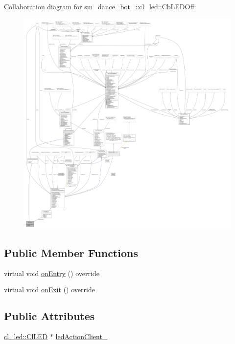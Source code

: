 Collaboration diagram for sm\+\_\+dance\+\_\+bot\+\_\+:\+:cl\+\_\+led\+:\+:Cb\+L\+E\+D\+Off\+:
\nopagebreak
\begin{figure}[H]
\begin{center}
\leavevmode
\includegraphics[width=350pt]{classsm__dance__bot__2_1_1cl__led_1_1CbLEDOff__coll__graph}
\end{center}
\end{figure}
\subsection*{Public Member Functions}
\begin{DoxyCompactItemize}
\item 
virtual void \hyperlink{classsm__dance__bot__2_1_1cl__led_1_1CbLEDOff_a101b78da1cfd4dcbec6fc607c956bd14}{on\+Entry} () override
\item 
virtual void \hyperlink{classsm__dance__bot__2_1_1cl__led_1_1CbLEDOff_a6ca7b3ba30347c4be33d3b4946009325}{on\+Exit} () override
\end{DoxyCompactItemize}
\subsection*{Public Attributes}
\begin{DoxyCompactItemize}
\item 
\hyperlink{classsm__dance__bot__2_1_1cl__led_1_1ClLED}{cl\+\_\+led\+::\+Cl\+L\+ED} $\ast$ \hyperlink{classsm__dance__bot__2_1_1cl__led_1_1CbLEDOff_a569146280ebdd71aa5b8f3268eb028bc}{led\+Action\+Client\+\_\+}
\end{DoxyCompactItemize}
